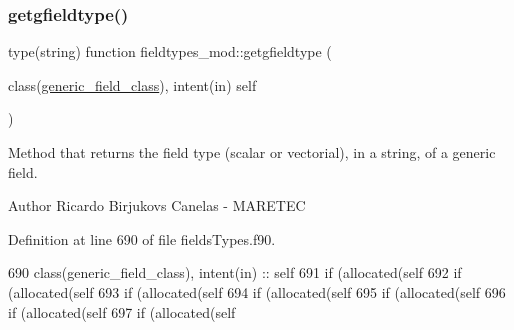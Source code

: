 \subsubsection{\texorpdfstring{getgfieldtype()}{getgfieldtype()}}
{\footnotesize\ttfamily type(string) function fieldtypes\+\_\+mod\+::getgfieldtype (\begin{DoxyParamCaption}\item[{class(\mbox{\hyperlink{structfieldtypes__mod_1_1generic__field__class}{generic\+\_\+field\+\_\+class}}), intent(in)}]{self }\end{DoxyParamCaption})\hspace{0.3cm}{\ttfamily [private]}}



Method that returns the field type (scalar or vectorial), in a string, of a generic field. 

\begin{DoxyAuthor}{Author}
Ricardo Birjukovs Canelas -\/ M\+A\+R\+E\+T\+EC 
\end{DoxyAuthor}


Definition at line 690 of file fields\+Types.\+f90.


\begin{DoxyCode}
690     \textcolor{keywordtype}{class}(generic\_field\_class), \textcolor{keywordtype}{intent(in)} :: self
691     \textcolor{keywordflow}{if} (\textcolor{keyword}{allocated}(self%
692     \textcolor{keywordflow}{if} (\textcolor{keyword}{allocated}(self%
693     \textcolor{keywordflow}{if} (\textcolor{keyword}{allocated}(self%
694     \textcolor{keywordflow}{if} (\textcolor{keyword}{allocated}(self%
695     \textcolor{keywordflow}{if} (\textcolor{keyword}{allocated}(self%
696     \textcolor{keywordflow}{if} (\textcolor{keyword}{allocated}(self%
697     \textcolor{keywordflow}{if} (\textcolor{keyword}{allocated}(self%
\end{DoxyCode}
\mbox{\label{namespacefieldtypes__mod_a3f1571ad15733a3f2fff43e35f309416}} 
